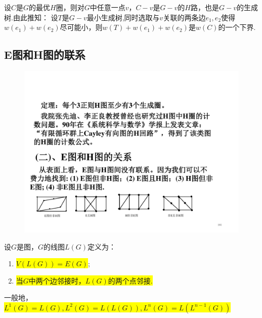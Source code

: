 设$C$是$G$的最优$H$圈，则对$G$中任意一点$v$，$C-v$是$G-v$的$H$路，也是$G-v$的生成树.由此推知： 设$T$是$G-v$最小生成树,同时选取与$v$关联的两条边$e_1, e_2$使得$w(e_1)+w(e_2)$尽可能小，则$w(T)+w(e_1)+w(e_2)$是$w(C)$的一个下界.

\subsection{E图和H图的联系}

\begin{figure}[H]
	\small
	\centering 
	\includegraphics[scale=0.8]{image/CH4EH.pdf}  
	\label{figkjjj1ik}  
\end{figure}

\begin{definition}[线图]
设$G$是图，$G$的线图$L(G)$定义为：
	\begin{enumerate}
	\item \colorbox{yellow}{$V(L(G))=E(G)$};
	\item  \colorbox{yellow}{当$G$中两个边邻接时，$L(G)$的两个点邻接.}
\end{enumerate}
\end{definition}
一般地，\colorbox{yellow}{$L^{1}(G)=L(G), L^{2}(G)=L(L(G)),L^{n}(G)=L(L^{n-1}(G))$}

